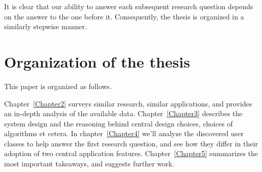 It is clear that our ability to answer each subsequent research question depends on the answer to the one before it. Consequently, the thesis is organized in a similarly stepwise manner.

\section{Organization of the thesis}
\label{sec:thesis_organization}

This paper is organized as follows.

Chapter~\ref{Chapter2} surveys similar research, similar applications, and provides an in-depth analysis of the available data.
Chapter~\ref{Chapter3} describes the system design and the reasoning behind central design choices, choices of algorithms et cetera.
In chapter~\ref{Chapter4} we'll analyze the discovered user classes to help answer the first research question, and see how they differ in their adoption of two central application features.
Chapter~\ref{Chapter5} summarizes the most important takeaways, and suggests further work.

